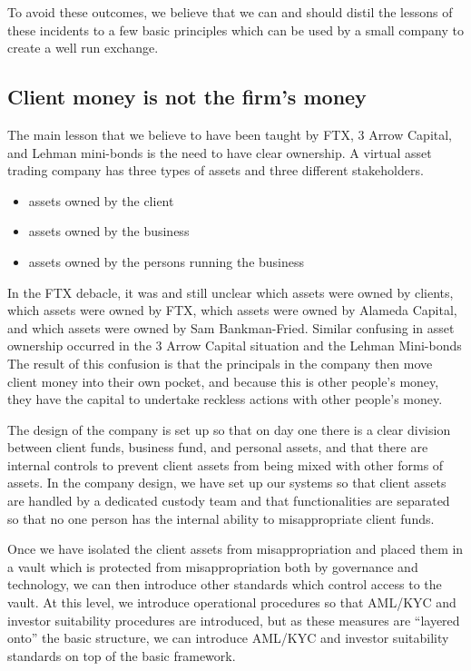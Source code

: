 To avoid these outcomes, we believe that we can and should distil the lessons of these 
incidents to a few basic principles which can be used by a small company to create a 
well run exchange.


\subsection{Client money is not the firm's money}

The main lesson that we believe to have been taught by FTX, 3 Arrow
Capital, and Lehman mini-bonds is the need to have clear ownership.  A
virtual asset trading company has three types of assets and three 
different stakeholders.

\begin{itemize}
\item assets owned by the client
\item assets owned by the business
\item assets owned by the persons running the business
\end{itemize}

In the FTX debacle, it was and still unclear which assets were owned
by clients, which assets were owned by FTX, which assets were owned by
Alameda Capital, and which assets were owned by Sam Bankman-Fried.
Similar confusing in asset ownership occurred in the 3 Arrow Capital
situation and the Lehman Mini-bonds   The result of this confusion is
that the principals in the company then move client money into their
own pocket, and because this is other people's money, they have
the capital to undertake reckless actions with other people's money.

The design of the company is set up so that on day one there is a
clear division between client funds, business fund, and personal
assets, and that there are internal controls to prevent client assets
from being mixed with other forms of assets.  In the company design, we
have set up our systems so that client assets are handled by a
dedicated custody team and that functionalities are separated so that
no one person has the internal ability to misappropriate client funds.

Once we have isolated the client assets from misappropriation and
placed them in a vault which is protected from misappropriation both
by governance and technology, we can then introduce other standards
which control access to the vault.  At this level, we introduce
operational procedures so that AML/KYC and investor suitability
procedures are introduced, but as these measures are ``layered onto''
the basic structure, we can introduce AML/KYC and investor
suitability standards on top of the basic framework.

